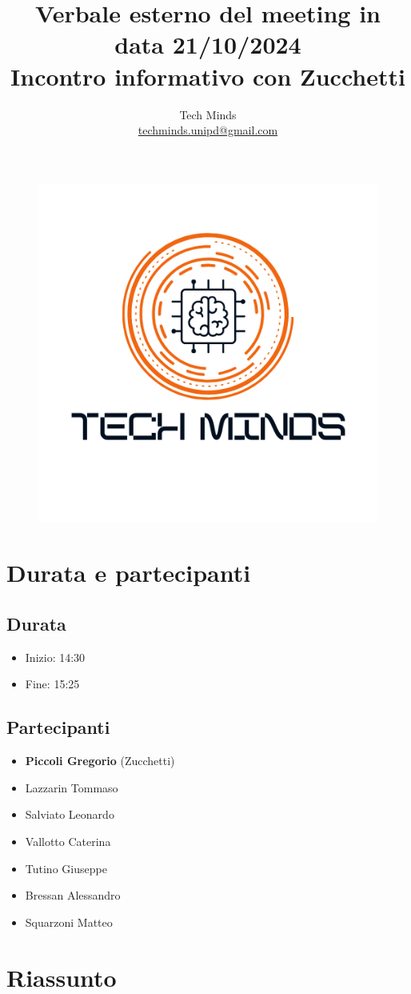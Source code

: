 \documentclass[10pt]{article}
\title{Verbale esterno del meeting in data 21/10/2024\\ \large{Incontro informativo con Zucchetti}}
\author{Tech Minds \\ \href{mailto:techminds.unipd@gmail.com}{techminds.unipd@gmail.com}}
\date{}
\begin{document}
\maketitle

\begin{figure}[h]
    \centering
    \includegraphics[width=0.4\linewidth]{../../../../assets/logo.png}
\end{figure}

\tableofcontents{\newpage}

\section{Durata e partecipanti}
\subsection{Durata}
\begin{itemize}
  \item Inizio: 14:30
  \item Fine: 15:25
\end{itemize}
\subsection{Partecipanti}
\begin{itemize}
    \item \textbf{Piccoli Gregorio} (Zucchetti)
    \item Lazzarin Tommaso
    \item Salviato Leonardo
    \item Vallotto Caterina
    \item Tutino Giuseppe
    \item Bressan Alessandro
    \item Squarzoni Matteo
\end{itemize}

\section{Riassunto}
\end{document}
